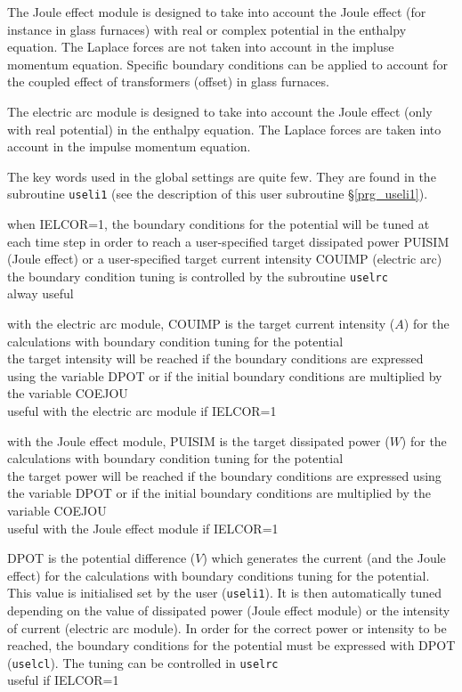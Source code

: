 The Joule effect module is designed to take into account the Joule effect
(for instance in glass furnaces) with real or complex potential in the
enthalpy equation. The Laplace forces are not taken into account in the
impluse momentum equation. Specific boundary conditions can be applied to
account for the coupled effect of transformers (offset) in glass furnaces.

The electric arc module is designed to take into account the Joule effect
(only with real potential) in the enthalpy equation. The Laplace forces
are taken into account in the impulse momentum equation.

The key words used in the global settings are quite few. They are
found in the subroutine \texttt{useli1} (see the description of this
user subroutine \S\ref{prg_useli1}).

{when IELCOR=1, the boundary conditions for the potential will be tuned at each
time step in order to reach a user-specified target dissipated power PUISIM
(Joule effect) or a user-specified target current intensity COUIMP (electric
arc)\\
the boundary condition tuning is controlled by the subroutine \texttt{uselrc}\\
alway useful}

{with the electric arc module, COUIMP is the target current intensity ($A$)
for the calculations with boundary condition tuning for the potential\\
the target intensity will be reached if the boundary conditions are expressed
using the variable DPOT or if the initial boundary conditions are multiplied by
the variable COEJOU\\
useful with the electric arc module if IELCOR=1}

{with the Joule effect module, PUISIM is the target dissipated power ($W$)
for the calculations with boundary condition tuning for the potential\\
the target power will be reached if the boundary conditions are expressed
using the variable DPOT or if the initial boundary conditions are multiplied by
the variable COEJOU\\
useful with the Joule effect module if IELCOR=1}

{DPOT is the potential difference ($V$) which generates the current (and the Joule effect) for the
calculations with boundary conditions tuning for the potential. This value is
initialised set by the user (\texttt{useli1}). It is then automatically tuned
depending on the value of dissipated power (Joule effect module) or the
intensity of current (electric arc module).
In order for the correct power or intensity to be reached, the boundary
conditions for the potential must be expressed with DPOT (\texttt{uselcl}). The
tuning can be controlled in \texttt{uselrc}\\
useful if IELCOR=1}

